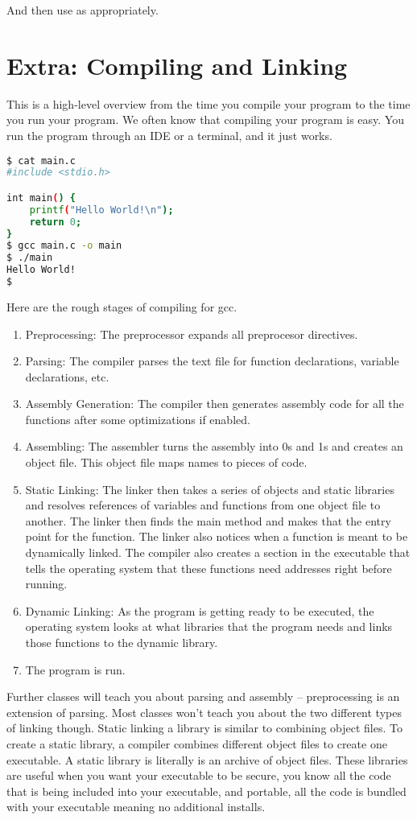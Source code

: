And then use as appropriately.

\section{Extra: Compiling and Linking}

This is a high-level overview from the time you compile your program to the time you run your program.
We often know that compiling your program is easy.
You run the program through an IDE or a terminal, and it just works.

\begin{lstlisting}[language=bash]
$ cat main.c
#include <stdio.h>

int main() {
    printf("Hello World!\n");
    return 0;
}
$ gcc main.c -o main
$ ./main
Hello World!
$
\end{lstlisting}

Here are the rough stages of compiling for gcc.

\begin{enumerate}
\item Preprocessing: The preprocessor expands all preprocesor directives.
\item Parsing: The compiler parses the text file for function declarations, variable declarations, etc.
\item Assembly Generation: The compiler then generates assembly code for all the functions after some optimizations if enabled.
\item Assembling: The assembler turns the assembly into 0s and 1s and creates an object file. This object file maps names to pieces of code.
\item Static Linking: The linker then takes a series of objects and static libraries and resolves references of variables and functions from one object file to another. The linker then finds the main method and makes that the entry point for the function. The linker also notices when a function is meant to be dynamically linked. The compiler also creates a section in the executable that tells the operating system that these functions need addresses right before running. 
\item Dynamic Linking: As the program is getting ready to be executed, the operating system looks at what libraries that the program needs and links those functions to the dynamic library.
\item The program is run.
\end{enumerate}

Further classes will teach you about parsing and assembly -- preprocessing is an extension of parsing.
Most classes won't teach you about the two different types of linking though.
Static linking a library is similar to combining object files.
To create a static library, a compiler combines different object files to create one executable.
A static library is literally is an archive of object files.
These libraries are useful when you want your executable to be secure, you know all the code that is being included into your executable, and portable, all the code is bundled with your executable meaning no additional installs.

